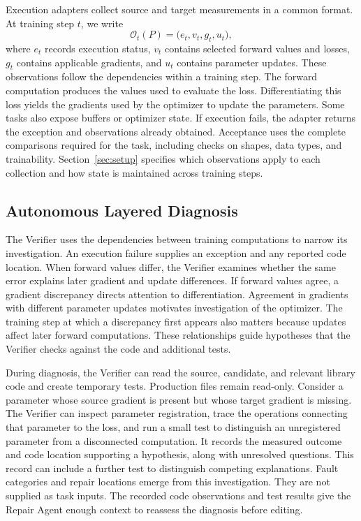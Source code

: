 \documentclass{article}
\begin{document}
Execution adapters collect source and target measurements in a common format. At training step $t$, we write
\begin{equation}
\mathcal{O}_t(P) = \bigl(e_t, v_t, g_t, u_t\bigr),
\end{equation}
where $e_t$ records execution status, $v_t$ contains selected forward values and losses, $g_t$ contains applicable gradients, and $u_t$ contains parameter updates. These observations follow the dependencies within a training step. The forward computation produces the values used to evaluate the loss. Differentiating this loss yields the gradients used by the optimizer to update the parameters. Some tasks also expose buffers or optimizer state. If execution fails, the adapter returns the exception and observations already obtained. Acceptance uses the complete comparisons required for the task, including checks on shapes, data types, and trainability. Section~\ref{sec:setup} specifies which observations apply to each collection and how state is maintained across training steps.

\subsection{Autonomous Layered Diagnosis}
\label{sec:hierarchy}

The Verifier uses the dependencies between training computations to narrow its investigation. An execution failure supplies an exception and any reported code location. When forward values differ, the Verifier examines whether the same error explains later gradient and update differences. If forward values agree, a gradient discrepancy directs attention to differentiation. Agreement in gradients with different parameter updates motivates investigation of the optimizer. The training step at which a discrepancy first appears also matters because updates affect later forward computations. These relationships guide hypotheses that the Verifier checks against the code and additional tests.

During diagnosis, the Verifier can read the source, candidate, and relevant library code and create temporary tests. Production files remain read-only. Consider a parameter whose source gradient is present but whose target gradient is missing. The Verifier can inspect parameter registration, trace the operations connecting that parameter to the loss, and run a small test to distinguish an unregistered parameter from a disconnected computation. It records the measured outcome and code location supporting a hypothesis, along with unresolved questions. This record can include a further test to distinguish competing explanations. Fault categories and repair locations emerge from this investigation. They are not supplied as task inputs. The recorded code observations and test results give the Repair Agent enough context to reassess the diagnosis before editing.
\end{document}

